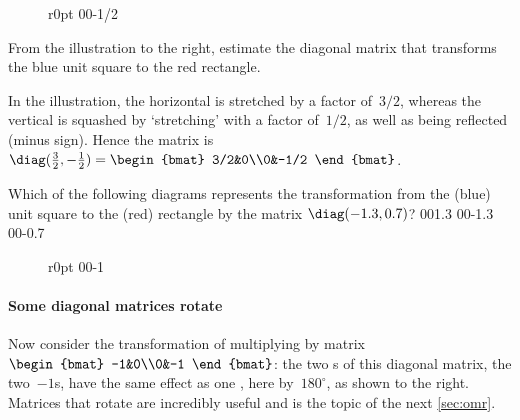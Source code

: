 \begin{wrapfigure}r{0pt} 00{-1/2} \end{wrapfigure}
\begin{example} 
From the illustration to the right, estimate the diagonal matrix that transforms the blue unit square to the red rectangle. 

\begin{solution} 
In the illustration, the horizontal is stretched by a factor of~\(3/2\), whereas the vertical is squashed by `stretching' with a factor of~\(1/2\), as well as being reflected (minus sign). 
Hence the matrix is
\(\diag(\frac32,-\frac12)=\begin{bmat} 3/2&0\\0&-1/2 \end{bmat}\).
\aqed

\end{solution}
\end{example}



\begin{activity}
Which of the following diagrams represents the transformation from the (blue) unit square to the (red) rectangle by the matrix \(\diag(-1.3,0.7)\)?
{00{1.3}}
{00{-1.3}}
{00{-0.7}}
\end{activity}




\begin{wrapfigure}r{0pt} 00{-1} \end{wrapfigure}
\paragraph{Some diagonal matrices rotate}
Now consider the transformation of multiplying by matrix \(\begin{bmat} -1&0\\0&-1 \end{bmat}\):
the two s of this diagonal matrix, the two~\(-1\)s, have  the same effect as one , here by~\(180^\circ\), as shown to the right.
Matrices that rotate are incredibly useful and is the topic of the next \cref{sec:omr}.





